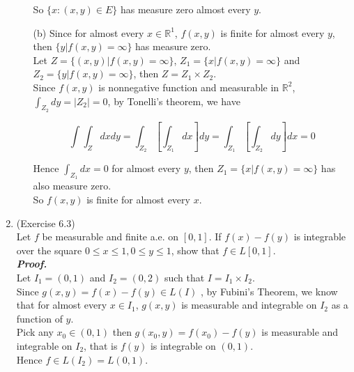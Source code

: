 \documentclass[a4paper,11pt]{article}
\begin{document}
\begin{enumerate}
\begin{enumerate}
 			So $\{ x : (x,y) \in E \}$ has measure zero almost every $y$.\\

 			\item [(b)] Since for almost every $x \in \mathbb{R}^1$, $f(x,y)$ is finite for almost every $y$, then $\{ y | f(x,y) = \infty \}$ has measure zero.\\
 			Let $Z = \{ (x,y) | f(x,y)=\infty \}$, $Z_1=\{ x | f(x,y)=\infty \}$ and $Z_2 = \{ y | f(x,y)=\infty \}$, then $Z = Z_1 \times Z_2$.\\
 			Since $f(x,y)$ is nonnegative function and measurable in $\mathbb{R}^2$, $\int_{Z_2} dy = |Z_2| = 0$, by Tonelli's theorem, we have

 			$$\int \int_Z dx dy
 			= \int_{Z_2} \left[ \int_{Z_1} dx \right] dy
 			= \int_{Z_1} \left[ \int_{Z_2} dy \right] dx
 			= 0$$

 			Hence $\int_{Z_1} dx = 0$ for almost every $y$, then $Z_1=\{ x | f(x,y)=\infty \}$ has also measure zero.\\
 			So $f(x,y)$ is finite for almost every $x$.\\


 		\end{enumerate}









 	\item (Exercise 6.3)\\
 		Let $f$ be measurable and finite a.e. on $[0,1]$. If $f(x) - f(y)$ is integrable over the square $0 \leq x \leq 1, 0 \leq y \leq 1$, show that $f \in L[0,1]$.\\
 		
 		\textit{\textbf {Proof.}}\\

 		Let $I_1 = (0,1)$ and $I_2 = (0,2)$ such that $I = I_1 \times I_2$.\\
 		Since $g(x,y) = f(x) - f(y) \in L(I)$ , by Fubini's Theorem, we know that for almost every $x \in I_1$, $g(x,y)$ is measurable and integrable on $I_2$ as a function of $y$.\\
 		Pick any $x_0 \in (0,1)$ then $g(x_0,y) = f(x_0) - f(y)$ is measurable and integrable on $I_2$, that is $f(y)$ is integrable on $(0,1)$.\\
 		Hence $f \in L(I_2) = L(0,1)$.\\





\end{enumerate}
\end{document}
